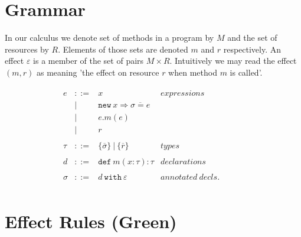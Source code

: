 \documentclass{article}
\newcommand{\keywadj}[1]{\mathtt{#1}}
\newcommand{\keyw}[1]{\keywadj{#1}~}
\begin{document}
\section{Grammar}

In our calculus we denote set of methods in a program by $M$ and the set of resources by $R$. Elements of those sets are denoted $m$ and $r$ respectively. An effect $\varepsilon$ is a member of the set of pairs $M \times R$. Intuitively we may read the effect $(m,r)$ as meaning 'the effect on resource $r$ when method $m$ is called'.

\[
\begin{array}{lll}

\begin{array}{lllr}
e & ::= & x & expressions \\
  & | & \keywadj{new}~x \Rightarrow \overline{\sigma = e} \\
  & | & e.m(e)\\
  & | & r \\
&&\\

\tau & ::= & \{ \overline{\sigma} \} ~ | ~ \{ \overline r \} & types \\

\\d & ::= & \keyw{def} m(x:\tau):\tau & declarations\\
&&\\

\sigma & ::= & d~\keyw{with}\varepsilon  & annotated~ decls.\\

\end{array}
& ~~~~~~
&
\end{array}
\]

\section{Effect Rules (Green)}
\end{document}
